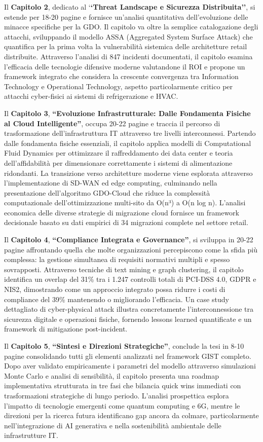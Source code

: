 Il \textbf{Capitolo 2}, dedicato al `\textbf{`Threat Landscape e Sicurezza Distribuita''}, si estende per 18-20 pagine e fornisce un'analisi quantitativa dell'evoluzione delle minacce specifiche per la GDO. Il capitolo va oltre la semplice catalogazione degli attacchi, sviluppando il modello ASSA (Aggregated System Surface Attack) che quantifica per la prima volta la vulnerabilità sistemica delle architetture retail distribuite. Attraverso l'analisi di 847 incidenti documentati, il capitolo esamina l'efficacia delle tecnologie difensive moderne valutandone il ROI e propone un framework integrato che considera la crescente convergenza tra Information Technology e Operational Technology, aspetto particolarmente critico per attacchi cyber-fisici ai sistemi di refrigerazione e HVAC.

Il \textbf{Capitolo 3}, \textbf{``Evoluzione Infrastrutturale: Dalle Fondamenta Fisiche al Cloud Intelligente''}, occupa 20-22 pagine e traccia il percorso di trasformazione dell'infrastruttura IT attraverso tre livelli interconnessi. Partendo dalle fondamenta fisiche essenziali, il capitolo applica modelli di Computational Fluid Dynamics per ottimizzare il raffreddamento dei data center e teoria dell'affidabilità per dimensionare correttamente i sistemi di alimentazione ridondanti. La transizione verso architetture moderne viene esplorata attraverso l'implementazione di SD-WAN ed edge computing, culminando nella presentazione dell'algoritmo GDO-Cloud che riduce la complessità computazionale dell'ottimizzazione multi-sito da O(n³) a O(n log n). L'analisi economica delle diverse strategie di migrazione cloud fornisce un framework decisionale basato su dati empirici di 34 migrazioni complete nel settore retail.

Il \textbf{Capitolo 4}, \textbf{``Compliance Integrata e Governance''}, si sviluppa in 20-22 pagine affrontando quella che molte organizzazioni percepiscono come la sfida più complessa: la gestione simultanea di requisiti normativi multipli e spesso sovrapposti. Attraverso tecniche di text mining e graph clustering, il capitolo identifica un overlap del 31\% tra i 1.247 controlli totali di PCI-DSS 4.0, GDPR e NIS2, dimostrando come un approccio integrato possa ridurre i costi di compliance del 39\% mantenendo o migliorando l'efficacia. Un case study dettagliato di cyber-physical attack illustra concretamente l'interconnessione tra sicurezza digitale e operazioni fisiche, fornendo lessons learned quantificate e un framework di mitigazione post-incident.

Il \textbf{Capitolo 5}, \textbf{``Sintesi e Direzioni Strategiche''}, conclude la tesi in 8-10 pagine consolidando tutti gli elementi analizzati nel framework GIST completo. Dopo aver validato empiricamente i parametri del modello attraverso simulazioni Monte Carlo e analisi di sensibilità, il capitolo presenta una roadmap implementativa strutturata in tre fasi che bilancia quick wins immediati con trasformazioni strategiche di lungo periodo. L'analisi prospettica esplora l'impatto di tecnologie emergenti come quantum computing e 6G, mentre le direzioni per la ricerca futura identificano gap ancora da colmare, particolarmente nell'integrazione di AI generativa e nella sostenibilità ambientale delle infrastrutture IT.

